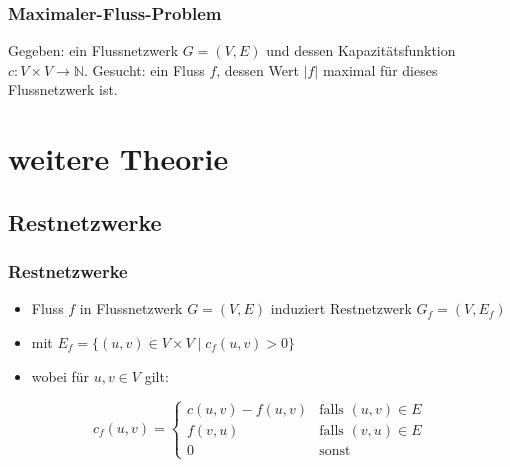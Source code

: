\documentclass{beamer}
\begin{document}
\begin{frame}
\frametitle{Maximaler-Fluss-Problem}
\begin{flushleft}
Gegeben: ein Flussnetzwerk $G = (V,E)$ und dessen Kapazitätsfunktion $c: V \times V \to \mathbb{N}$.\linebreak
Gesucht: ein Fluss $f$, dessen Wert $\lvert f \rvert$ maximal für dieses Flussnetzwerk ist.
\end{flushleft}
\end{frame}

\section{weitere Theorie}
\subsection{Restnetzwerke}
\begin{frame}
\frametitle{Restnetzwerke}
\begin{itemize}
\item Fluss $f$ in Flussnetzwerk $G=(V,E)$ induziert Restnetzwerk $G_{f}=(V,E_{f})$
\item mit $E_f = \{ (u,v) \in V \times V \mid c_{f}(u,v) > 0\}$
\item wobei für $u,v \in V$ gilt: 
\end{itemize}
\begin{equation}
c_{f}(u,v) = 
\begin{cases}
c(u,v) - f(u,v) & \text{falls $(u,v)\in E$}\\
f(v,u) & \text{falls $(v,u) \in E$}\\
0 & \text{sonst}
\end{cases}
\nonumber
\end{equation}
\end{frame}
\end{document}
